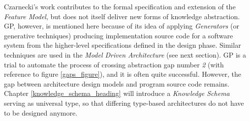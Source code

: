 Czarnecki's work contributes to the formal specification and extension of the
\emph{Feature Model}, but does not itself deliver new forms of knowledge
abstraction. GP, however, is mentioned here because of its idea of applying
\emph{Generators} (or generative techniques) producing implementation source
code for a software system from the higher-level specifications defined in the
design phase. Similar techniques are used in the
\emph{Model Driven Architecture} (see next section). GP is a trial to automate
the process of crossing abstraction gap number \emph{2} (with reference to
figure \ref{gaps_figure}), and it is often quite successful. However, the gap
between architecture design models and program source code remains. Chapter
\ref{knowledge_schema_heading} will introduce a \emph{Knowledge Schema} serving
as universal type, so that differing type-based architectures do not have to be
designed anymore.
